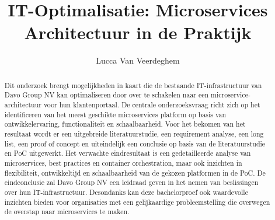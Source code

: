 \documentclass{hogent-article}
\title{IT-Optimalisatie: Microservices Architectuur in de Praktijk}
\author{Lucca Van Veerdeghem}
\begin{document}
\begin{abstract}
Dit onderzoek brengt mogelijkheden in kaart die de bestaande IT-infrastructuur van Davo Group NV kan optimaliseren door over te schakelen naar een microservice-architectuur voor hun klantenportaal. De centrale onderzoeksvraag richt zich op het identificeren van het meest geschikte microservices platform op basis van ontwikkelervaring, functionaliteit en schaalbaarheid. Voor het bekomen van het resultaat wordt er een uitgebreide literatuurstudie, een requirement analyse, een long list, een proof of concept en uiteindelijk een conclusie op basis van de literatuurstudie en PoC uitgewerkt. Het verwachte eindresultaat is een gedetailleerde analyse van microservices, best practices en container orchestration, maar ook inzichten in flexibiliteit, ontwikkeltijd en schaalbaarheid van de gekozen platformen in de PoC. De eindconclusie zal Davo Group NV een leidraad geven in het nemen van beslissingen over hun IT-infrastructuur. Desondanks kan deze bachelorproef ook waardevolle inzichten bieden voor organisaties met een gelijkaardige probleemstelling die overwegen de overstap naar microservices te maken.
    
\end{abstract}

\tableofcontents



\printbibliography[heading=bibintoc]
\end{document}
